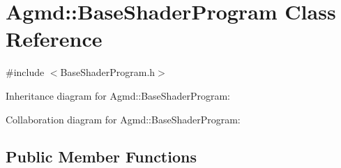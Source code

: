 \hypertarget{class_agmd_1_1_base_shader_program}{\section{Agmd\+:\+:Base\+Shader\+Program Class Reference}
\label{class_agmd_1_1_base_shader_program}
}


{\ttfamily \#include $<$Base\+Shader\+Program.\+h$>$}



Inheritance diagram for Agmd\+:\+:Base\+Shader\+Program\+:


Collaboration diagram for Agmd\+:\+:Base\+Shader\+Program\+:
\subsection*{Public Member Functions}
